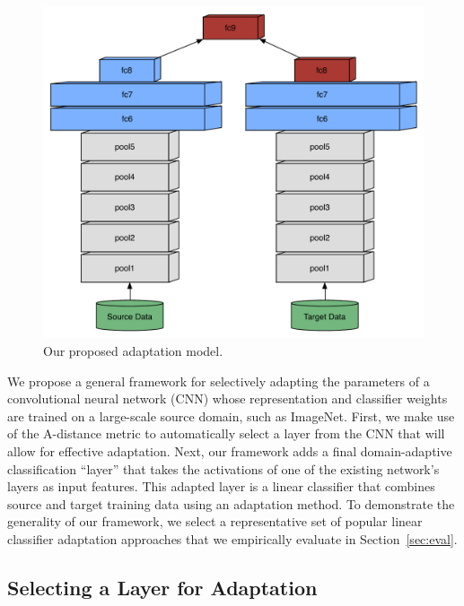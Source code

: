 \newcommand{\svmT}{\bm{\theta}}
\newcommand{\svmB}{b}
\newcommand{\svmAug}{\tilde{\svmT}}
\newcommand{\svmAugAll}{\bm{\Theta}}

\begin{figure}
\begin{center}
\includegraphics[width=.7\linewidth]{figs/model-adapt}
\end{center}
\caption{Our proposed adaptation model.}
\label{fig:model}
\end{figure}


We propose a general framework for selectively adapting the parameters of a
convolutional neural network (CNN) whose representation and classifier weights
are trained on a large-scale source domain, such as ImageNet. First, we make use
of the A-distance metric  to automatically select a layer
from the CNN that will allow for effective adaptation. Next, our framework adds
a final domain-adaptive classification ``layer'' that takes the activations of
one of the existing network's layers as input features. This adapted layer is a
linear classifier that combines source and target training data using an
adaptation method. To demonstrate the generality of our framework, we select a
representative set of popular linear classifier adaptation approaches that we
empirically evaluate in Section~\ref{sec:eval}.

\subsection{Selecting a Layer for Adaptation}

